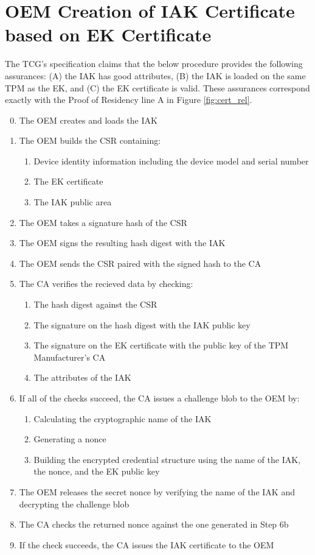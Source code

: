 \section{OEM Creation of IAK Certificate based on EK Certificate}
The TCG's specification claims that the below procedure provides the following assurances: (A) the IAK has good attributes, (B) the IAK is  loaded on the same TPM as the EK, and (C) the EK certificate is valid. These assurances correspond exactly with the Proof of Residency line A in Figure \ref{fig:cert_rel}. 
\begin{enumerate}[itemsep=0pt,parsep=0pt,partopsep=0pt]
  \setcounter{enumi}{-1}
  \item The OEM creates and loads the IAK
  \item The OEM builds the CSR containing:
  \begin{enumerate}[topsep=0pt, itemsep=0pt,parsep=0pt,partopsep=0pt]
    \item Device identity information including the device model and serial
    number
    \item The EK certificate
    \item The IAK public area
  \end{enumerate}
  \item The OEM takes a signature hash of the CSR
  \item The OEM signs the resulting hash digest with the IAK
  \item The OEM sends the CSR paired with the signed hash to the CA
  \item The CA verifies the recieved data by checking:
  \begin{enumerate}[topsep=0pt, itemsep=0pt,parsep=0pt,partopsep=0pt]
    \item The hash digest against the CSR
    \item The signature on the hash digest with the IAK public key
    \item The signature on the EK certificate with the public key of the TPM Manufacturer's CA
    \item The attributes of the IAK
  \end{enumerate}
  \item If all of the checks succeed, the CA issues a challenge blob to the OEM by:
  \begin{enumerate}[topsep=0pt, itemsep=0pt,parsep=0pt,partopsep=0pt]
    \item Calculating the cryptographic name of the IAK
    \item Generating a nonce
    \item Building the encrypted credential structure using the name of the IAK, the nonce, and the EK public key
  \end{enumerate}
  \item The OEM releases the secret nonce by verifying the name of the IAK and decrypting the challenge blob
  \item The CA checks the returned nonce against the one generated in Step 6b
  \item If the check succeeds, the CA issues the IAK certificate to the OEM
\end{enumerate}

